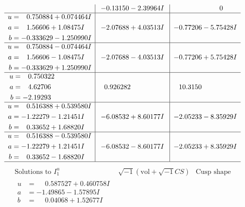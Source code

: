 \documentclass[1p]{elsarticle_modified}
\theoremstyle{definition}
\newcommand{\I}{\sqrt{-1}}
\begin{document}
$$\begin{array}{c|c|c}
 & -0.13150 - 2.39964 I & \phantom{-0.000000 } 0 \\ \hline\begin{aligned}
u &= \phantom{-}0.750884 + 0.074464 I \\
a &= \phantom{-}1.56606 + 1.08475 I \\
b &= -0.333629 - 1.250990 I\end{aligned}
 & -2.07688 + 4.03513 I & -0.77206 - 5.75428 I \\ \hline\begin{aligned}
u &= \phantom{-}0.750884 - 0.074464 I \\
a &= \phantom{-}1.56606 - 1.08475 I \\
b &= -0.333629 + 1.250990 I\end{aligned}
 & -2.07688 - 4.03513 I & -0.77206 + 5.75428 I \\ \hline\begin{aligned}
u &= \phantom{-}0.750322\phantom{ +0.000000I} \\
a &= \phantom{-}4.62706\phantom{ +0.000000I} \\
b &= -2.19293\phantom{ +0.000000I}\end{aligned}
 & \phantom{-}0.926282\phantom{ +0.000000I} & \phantom{-}10.3150\phantom{ +0.000000I} \\ \hline\begin{aligned}
u &= \phantom{-}0.516388 + 0.539580 I \\
a &= -1.22279 - 1.21451 I \\
b &= \phantom{-}0.33652 + 1.68820 I\end{aligned}
 & -6.08532 + 8.60177 I & -2.05233 - 8.35929 I \\ \hline\begin{aligned}
u &= \phantom{-}0.516388 - 0.539580 I \\
a &= -1.22279 + 1.21451 I \\
b &= \phantom{-}0.33652 - 1.68820 I\end{aligned}
 & -6.08532 - 8.60177 I & -2.05233 + 8.35929 I\\
 \hline 
 \end{array}$$\newpage$$\begin{array}{c|c|c}  
\text{Solutions to }I^u_{1}& \I (\text{vol} + \sqrt{-1}CS) & \text{Cusp shape}\\
 \hline 
\begin{aligned}
u &= \phantom{-}0.587527 + 0.460758 I \\
a &= -1.49865 - 1.57895 I \\
b &= \phantom{-}0.04068 + 1.52677 I\end{aligned}

\end{array}$$
\end{document}
